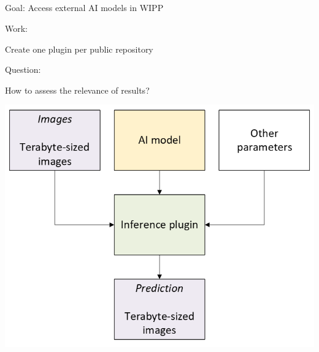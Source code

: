 \subsection{\slidetitle}
\begin{frame}
  \frametitle{\sectiontitle}
  \framesubtitle{\slidetitle}

  \begin{minipage}[h!]{0.53\textwidth}
    Goal: Access external AI models in WIPP

    \bigskip

    Work:

    Create one plugin per public repository

    \bigskip

    Question:

    How to assess the relevance of results?

  \end{minipage}\hfill
  \begin{minipage}[h!]{0.46\textwidth}
    \includegraphics[scale=0.55]{./img/2_ai-plugins/inference.png}
  \end{minipage}
\end{frame}

\def\slidetitle{Evaluate results}


